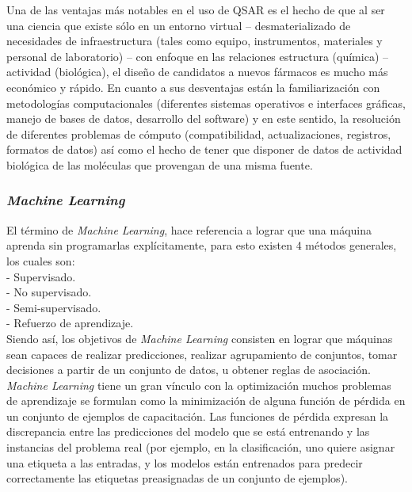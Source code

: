 \noindent Una de las ventajas más notables en el uso de QSAR es el hecho de que al ser una ciencia que existe sólo en un entorno virtual – desmaterializado de necesidades de infraestructura (tales como equipo, instrumentos, materiales y personal de laboratorio) – con enfoque en las relaciones estructura (química) – actividad (biológica), el diseño de candidatos a nuevos fármacos es mucho más económico y rápido. En cuanto a sus desventajas están la familiarización con metodologías computacionales (diferentes sistemas operativos e interfaces gráficas, manejo de bases de datos, desarrollo del software) y en este sentido, la resolución de diferentes problemas de cómputo (compatibilidad, actualizaciones, registros, formatos de datos) así como el hecho de tener que disponer de datos de actividad biológica de las moléculas que provengan de una misma fuente.\\

\subsubsection{\textit{Machine Learning}}
\noindent El término de \textit{Machine Learning}, hace referencia a lograr que una máquina aprenda sin programarlas explícitamente, para esto existen 4 métodos generales, los cuales son:\\

\noindent- Supervisado.\\
- No supervisado.\\
- Semi-supervisado.\\
- Refuerzo de aprendizaje.\\

\noindent Siendo así, los objetivos de \textit{Machine Learning} consisten en lograr que máquinas sean capaces de realizar predicciones, realizar agrupamiento de conjuntos, tomar decisiones a partir de un conjunto de datos, u obtener reglas de asociación.\cite{10}\\

\noindent \textit{Machine Learning} tiene un gran vínculo  con la optimización   muchos problemas de aprendizaje se formulan como la minimización de alguna función de pérdida en un conjunto de ejemplos de capacitación. Las funciones de pérdida expresan la discrepancia entre las predicciones del modelo que se está entrenando y las instancias del problema real (por ejemplo, en la clasificación, uno quiere asignar una etiqueta a las entradas, y los modelos están entrenados para predecir correctamente las etiquetas preasignadas de un conjunto de ejemplos).\\

